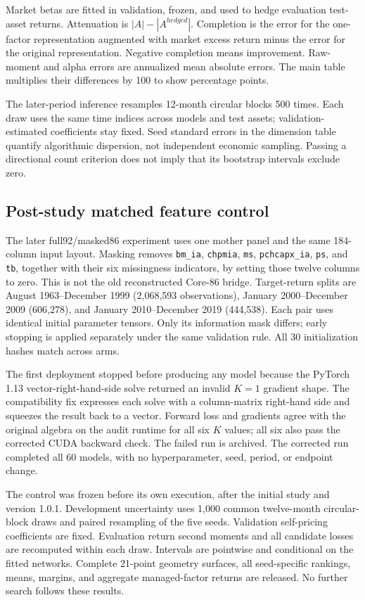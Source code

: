 \documentclass[11pt]{article}
\begin{document}
Market betas are fitted in validation, frozen, and used to hedge evaluation test-asset returns. Attenuation is $|A|-|A^{hedged}|$. Completion is the error for the one-factor representation augmented with market excess return minus the error for the original representation. Negative completion means improvement. Raw-moment and alpha errors are annualized mean absolute errors. The main table multiplies their differences by 100 to show percentage points.

The later-period inference resamples 12-month circular blocks 500 times. Each draw uses the same time indices across models and test assets; validation-estimated coefficients stay fixed. Seed standard errors in the dimension table quantify algorithmic dispersion, not independent economic sampling. Passing a directional count criterion does not imply that its bootstrap intervals exclude zero.



\subsection{Post-study matched feature control}
The later full92/masked86 experiment uses one mother panel and the same 184-column input layout. Masking removes \texttt{bm\_ia}, \texttt{chpmia}, \texttt{ms}, \texttt{pchcapx\_ia}, \texttt{ps}, and \texttt{tb}, together with their six missingness indicators, by setting those twelve columns to zero. This is not the old reconstructed Core-86 bridge. Target-return splits are August 1963--December 1999 (2,068,593 observations), January 2000--December 2009 (606,278), and January 2010--December 2019 (444,538). Each pair uses identical initial parameter tensors. Only its information mask differs; early stopping is applied separately under the same validation rule. All 30 initialization hashes match across arms.

The first deployment stopped before producing any model because the PyTorch 1.13 vector-right-hand-side solve returned an invalid $K=1$ gradient shape. The compatibility fix expresses each solve with a column-matrix right-hand side and squeezes the result back to a vector. Forward loss and gradients agree with the original algebra on the audit runtime for all six $K$ values; all six also pass the corrected CUDA backward check. The failed run is archived. The corrected run completed all 60 models, with no hyperparameter, seed, period, or endpoint change.

The control was frozen before its own execution, after the initial study and version 1.0.1. Development uncertainty uses 1,000 common twelve-month circular-block draws and paired resampling of the five seeds. Validation self-pricing coefficients are fixed. Evaluation return second moments and all candidate losses are recomputed within each draw. Intervals are pointwise and conditional on the fitted networks. Complete 21-point geometry surfaces, all seed-specific rankings, means, margins, and aggregate managed-factor returns are released. No further search follows these results.
\end{document}
